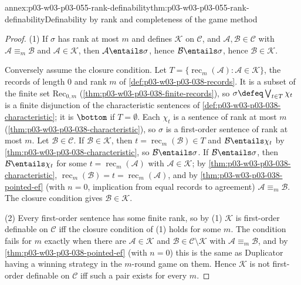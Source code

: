 \begin{annexitem}{annex:p03-w03-p03-055-rank-definability}{thm:p03-w03-p03-055-rank-definability}{Definability by rank and completeness of the game method}
\begin{proof}
(1) If \(\sigma\) has rank at most \(m\) and defines \(\mathcal K\) on
\(\mathcal C\), and \(\mathcal A,\mathcal B\in\mathcal C\) with
\(\mathcal A\equiv_m\mathcal B\) and \(\mathcal A\in\mathcal K\), then
\(\mathcal A\entails\sigma\), hence \(\mathcal B\entails\sigma\), hence
\(\mathcal B\in\mathcal K\).

Conversely assume the closure condition. Let
\(T=\{\operatorname{rec}_m(\mathcal A):\mathcal A\in\mathcal K\}\), the
records of length \(0\) and rank \(m\) of
\cref{def:p03-w03-p03-038-records}. It is a subset of the finite set
\(\mathrm{Rec}_{0,m}\) (\cref{thm:p03-w03-p03-038-finite-records}), so
\(\sigma\defeq\bigvee_{t\in T}\chi_t\) is a finite disjunction of the
characteristic sentences of \cref{def:p03-w03-p03-038-characteristic}; it
is \(\bottom\) if \(T=\emptyset\). Each \(\chi_t\) is a sentence of rank at
most \(m\) (\cref{thm:p03-w03-p03-038-characteristic}), so \(\sigma\) is a
first-order sentence of rank at most \(m\). Let
\(\mathcal B\in\mathcal C\). If \(\mathcal B\in\mathcal K\), then
\(t=\operatorname{rec}_m(\mathcal B)\in T\) and
\(\mathcal B\entails\chi_t\) by \cref{thm:p03-w03-p03-038-characteristic},
so \(\mathcal B\entails\sigma\). If \(\mathcal B\entails\sigma\), then
\(\mathcal B\entails\chi_t\) for some \(t=\operatorname{rec}_m(\mathcal A)\)
with \(\mathcal A\in\mathcal K\); by
\cref{thm:p03-w03-p03-038-characteristic},
\(\operatorname{rec}_m(\mathcal B)=t=\operatorname{rec}_m(\mathcal A)\), and
by \cref{thm:p03-w03-p03-038-pointed-ef} (with \(n=0\), implication from
equal records to agreement) \(\mathcal A\equiv_m\mathcal B\). The closure
condition gives \(\mathcal B\in\mathcal K\).

(2) Every first-order sentence has some finite rank, so by (1)
\(\mathcal K\) is first-order definable on \(\mathcal C\) iff the closure
condition of (1) holds for some \(m\). The condition fails for \(m\)
exactly when there are \(\mathcal A\in\mathcal K\) and
\(\mathcal B\in\mathcal C\setminus\mathcal K\) with
\(\mathcal A\equiv_m\mathcal B\), and by
\cref{thm:p03-w03-p03-038-pointed-ef} (with \(n=0\)) this is the same as
Duplicator having a winning strategy in the \(m\)-round game on them. Hence
\(\mathcal K\) is not first-order definable on \(\mathcal C\) iff such a
pair exists for every \(m\).
\end{proof}
\end{annexitem}

